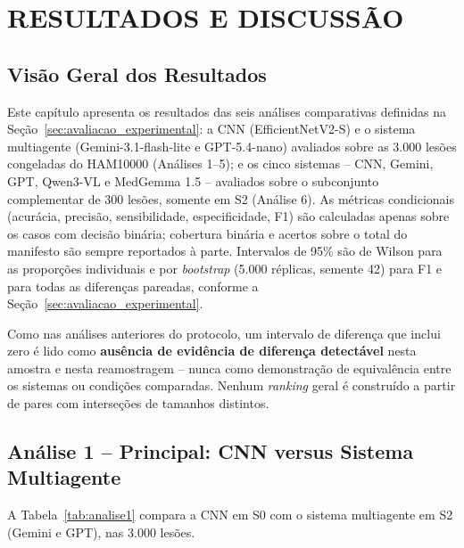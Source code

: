 \chapter[RESULTADOS E DISCUSSÃO]{RESULTADOS E DISCUSSÃO}

\section{Visão Geral dos Resultados}

Este capítulo apresenta os resultados das seis análises comparativas definidas na Seção~\ref{sec:avaliacao_experimental}: a CNN (EfficientNetV2-S) e o sistema multiagente (Gemini-3.1-flash-lite e GPT-5.4-nano) avaliados sobre as 3.000 lesões congeladas do HAM10000 (Análises 1--5); e os cinco sistemas -- CNN, Gemini, GPT, Qwen3-VL e MedGemma 1.5 -- avaliados sobre o subconjunto complementar de 300 lesões, somente em S2 (Análise 6). As métricas condicionais (acurácia, precisão, sensibilidade, especificidade, F1) são calculadas apenas sobre os casos com decisão binária; cobertura binária e acertos sobre o total do manifesto são sempre reportados à parte. Intervalos de 95\% são de Wilson para as proporções individuais e por \textit{bootstrap} (5.000 réplicas, semente 42) para F1 e para todas as diferenças pareadas, conforme a Seção~\ref{sec:avaliacao_experimental}.

Como nas análises anteriores do protocolo, um intervalo de diferença que inclui zero é lido como \textbf{ausência de evidência de diferença detectável} nesta amostra e nesta reamostragem -- nunca como demonstração de equivalência entre os sistemas ou condições comparadas. Nenhum \textit{ranking} geral é construído a partir de pares com interseções de tamanhos distintos.

\section{Análise 1 -- Principal: CNN versus Sistema Multiagente}
\label{sec:resultados_analise1}

A Tabela~\ref{tab:analise1} compara a CNN em S0 com o sistema multiagente em S2 (Gemini e GPT), nas 3.000 lesões.

